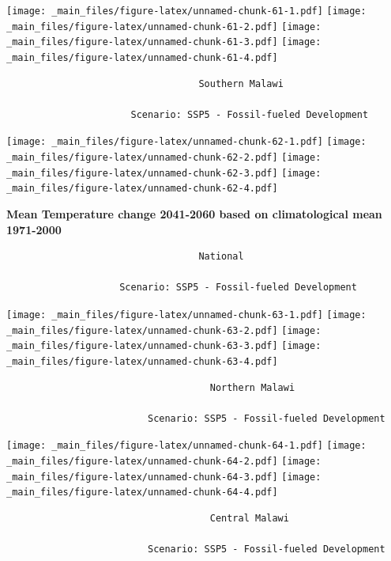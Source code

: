 \documentclass[
]{book}
\begin{document}
\texttt{[image: \_main\_files/figure-latex/unnamed-chunk-61-1.pdf]} \texttt{[image: \_main\_files/figure-latex/unnamed-chunk-61-2.pdf]} \texttt{[image: \_main\_files/figure-latex/unnamed-chunk-61-3.pdf]} \texttt{[image: \_main\_files/figure-latex/unnamed-chunk-61-4.pdf]}

\begin{verbatim}
                                  Southern Malawi
                                  
                      Scenario: SSP5 - Fossil-fueled Development
\end{verbatim}

\texttt{[image: \_main\_files/figure-latex/unnamed-chunk-62-1.pdf]} \texttt{[image: \_main\_files/figure-latex/unnamed-chunk-62-2.pdf]} \texttt{[image: \_main\_files/figure-latex/unnamed-chunk-62-3.pdf]} \texttt{[image: \_main\_files/figure-latex/unnamed-chunk-62-4.pdf]}

\textbf{Mean Temperature change 2041-2060 based on climatological mean 1971-2000}

\begin{verbatim}
                                  National
                                  
                    Scenario: SSP5 - Fossil-fueled Development
\end{verbatim}

\texttt{[image: \_main\_files/figure-latex/unnamed-chunk-63-1.pdf]} \texttt{[image: \_main\_files/figure-latex/unnamed-chunk-63-2.pdf]} \texttt{[image: \_main\_files/figure-latex/unnamed-chunk-63-3.pdf]} \texttt{[image: \_main\_files/figure-latex/unnamed-chunk-63-4.pdf]}

\begin{verbatim}
                                    Northern Malawi
                                    
                         Scenario: SSP5 - Fossil-fueled Development
\end{verbatim}

\texttt{[image: \_main\_files/figure-latex/unnamed-chunk-64-1.pdf]} \texttt{[image: \_main\_files/figure-latex/unnamed-chunk-64-2.pdf]} \texttt{[image: \_main\_files/figure-latex/unnamed-chunk-64-3.pdf]} \texttt{[image: \_main\_files/figure-latex/unnamed-chunk-64-4.pdf]}

\begin{verbatim}
                                    Central Malawi
                                    
                         Scenario: SSP5 - Fossil-fueled Development
\end{verbatim}
\end{document}

